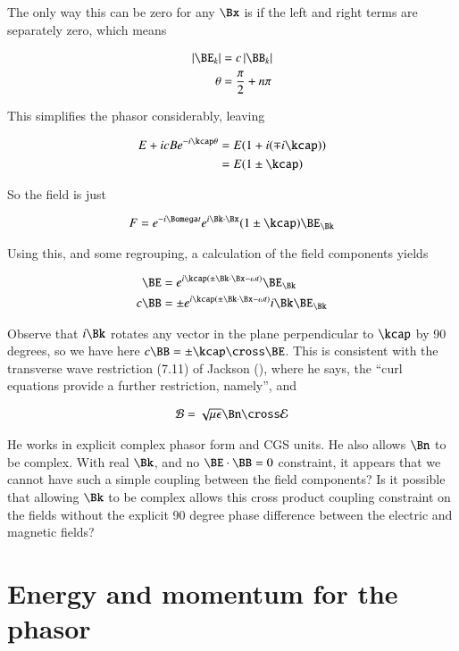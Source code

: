 The only way this can be zero for any $\Bx$ is if the left and right terms are separately zero, which means

\begin{align*}
\Abs{\BE_k} &= c \Abs{\BB_k} \\
\theta &= \frac{\pi}{2} + n \pi
\end{align*}

This simplifies the phasor considerably, leaving

\begin{align*}
E + i c B e^{-i\kcap \theta}
&=
E(1 + i (\mp i\kcap )) \\
&=
E(1 \pm \kcap)
\end{align*}

So the field is just

\begin{align}
F = e^{-i \Bomega t} e^{i \Bk \cdot \Bx} (1 \pm \kcap) \BE_\Bk
\end{align}

Using this, and some regrouping, a calculation of the field components yields

\begin{align}
\BE &= e^{i \kcap( \pm \Bk \cdot \Bx -\omega t )} \BE_\Bk \\
c \BB &= \pm e^{i \kcap( \pm \Bk \cdot \Bx -\omega t )} i \Bk \BE_\Bk
\end{align}

Observe that $i\Bk$ rotates any vector in the plane perpendicular to $\kcap$ by 90 degrees, so we have here $c \BB = \pm \kcap \cross \BE$.  This is consistent with the transverse wave restriction (7.11) of Jackson (\citep{jackson1975cew}), where he says, the ``curl equations provide a further restriction, namely'', and 

\begin{align}\label{eqn:fooX}
\mathcal{B} = \sqrt{\mu\epsilon} \Bn \cross \mathcal{E}
\end{align}

He works in explicit complex phasor form and CGS units.  He also allows $\Bn$ to be complex.  With real $\Bk$, and no $\BE \cdot \BB = 0$ constraint, it appears that we cannot have such a simple coupling between the field components?  Is it possible that allowing $\Bk$ to be complex allows this cross product coupling constraint on the fields without the explicit 90 degree phase difference between the electric and magnetic fields?

\section{Energy and momentum for the phasor}

